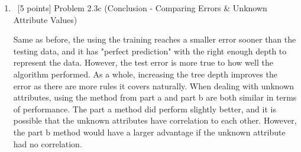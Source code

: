 \documentclass[8pt, fullpage,letterpaper]{article}
\begin{document}
\begin{enumerate}
\begin{enumerate}
\begin{center}
\begin{tabular}{c|c|c|c}
			\end{tabular}
		\end{center}

	
\color{black}
	\item~[5 points] Problem 2.3c (Conclusion - Comparing Errors \& Unknown Attribute Values)

	\color{violet}
	Same as before, the using the training reaches a smaller error sooner than the testing data, and it has "perfect prediction" with the right enough depth to represent the data. However, the test error is more true to how well the algorithm performed. As a whole, increasing the tree depth improves the error as there are more rules it covers naturally. When dealing with unknown attributes, using the method from part a and part b are both similar in terms of performance. The part a method did perform slightly better, and it is possible that the unknown attributes have correlation to each other. However, the part b method would have a larger advantage if the unknown attribute had no correlation.

\end{enumerate}
\end{enumerate}

 
\end{document}
